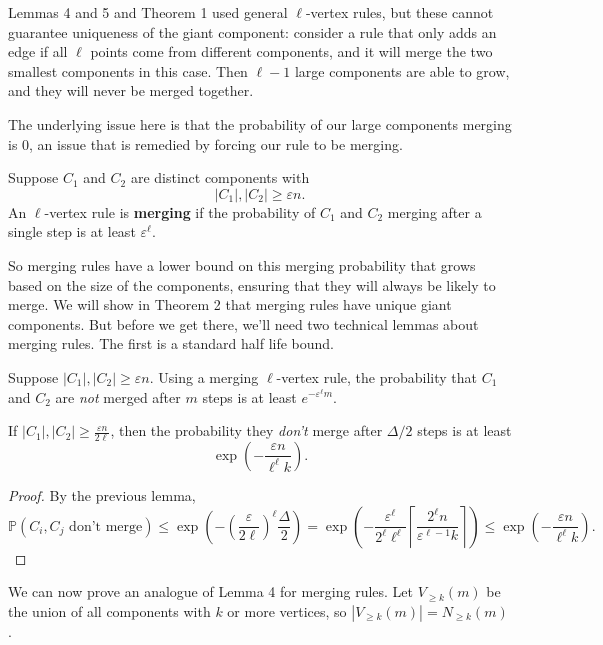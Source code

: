 \documentclass[twoside,10pt]{report}
\begin{document}
Lemmas 4 and 5 and Theorem 1 used general $\ell$-vertex rules, but these cannot guarantee uniqueness of the giant component: consider a rule that only adds an edge if all $\ell$ points come from different components, and it will merge the two smallest components in this case. Then $\ell-1$ large components are able to grow, and they will never be merged together.

The underlying issue here is that the probability of our large components merging is 0, an issue that is remedied by forcing our rule to be merging.

\begin{defn}[]
Suppose $C_1$ and $C_2$ are distinct components with
\[
|C_1|, |C_2| \geq \varepsilon n.
\] An $\ell$-vertex rule is \textbf{merging} if the probability of $C_1$ and $C_2$ merging after a single step is at least $\varepsilon^{\ell}$.
\end{defn}

So merging rules have a lower bound on this merging probability that grows based on the size of the components, ensuring that they will always be likely to merge. We will show in Theorem 2 that merging rules have unique giant components. But before we get there, we'll need two technical lemmas about merging rules. The first is a standard half life bound.

\begin{lem}
Suppose $|C_1|,|C_2| \geq \varepsilon n$. Using a merging $\ell$-vertex rule, the probability that $C_1$ and $C_2$ are \textit{not} merged after $m$ steps is at least $e^{-\varepsilon^{\ell}m}$.
\end{lem}

\begin{cor}
	If $|C_1|,|C_2| \geq \frac{\varepsilon n}{2\ell} $, then the probability they \textit{don't} merge after $\Delta/2$ steps is at least
	\[
		\exp\left(-\frac{\varepsilon n}{\ell^\ell k}\right).
	\] 
\end{cor}
\begin{proof}
	By the previous lemma,
	\[
		\mathbb{P}(C_i, C_j \text{ don't merge}) \leq \exp\left( - \left(\frac{\varepsilon}{2\ell} \right)^{\ell} \frac{\Delta}{2}  \right) = \exp\left( - \frac{\varepsilon^{\ell}}{2^{\ell}\ell^{\ell}} \left\lceil \frac{2^{\ell}n}{\varepsilon^{\ell-1}k} \right\rceil \right) \leq \exp\left( -\frac{\varepsilon n}{\ell^{\ell}k}  \right).
	\] 
\end{proof}

We can now prove an analogue of Lemma 4 for merging rules. Let $V_{\geq k}(m)$ be the union of all components with $k$ or more vertices, so $|V_{\geq k}(m)| = N_{\geq k}(m)$.
\end{document}

